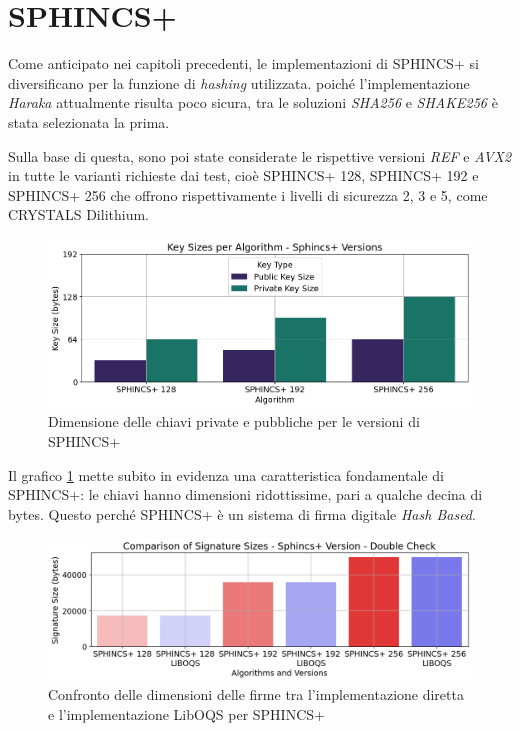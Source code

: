 \section{SPHINCS+}

Come anticipato nei capitoli precedenti, le implementazioni di SPHINCS+ si diversificano per la funzione di \textit{hashing} utilizzata. poiché l'implementazione \textit{Haraka} attualmente risulta poco sicura, tra le soluzioni \textit{SHA256} e \textit{SHAKE256} è stata selezionata la prima.

Sulla base di questa, sono poi state considerate le rispettive versioni \textit{REF} e \textit{AVX2} in tutte le varianti richieste dai test, cioè SPHINCS+ 128, SPHINCS+ 192 e SPHINCS+ 256 che offrono rispettivamente i livelli di sicurezza 2, 3 e 5, come CRYSTALS Dilithium.

\begin{figure}[H]
    \centering
    \includegraphics[width=1\textwidth]{Immagini/20240822_i9/Key_Sizes/KC_sphincs.png}
    \caption{Dimensione delle chiavi private e pubbliche per le versioni di SPHINCS+}
    \label{fig:KC_sphincs}
\end{figure}

Il grafico \ref{fig:KC_sphincs} mette subito in evidenza una caratteristica fondamentale di SPHINCS+: le chiavi hanno dimensioni ridottissime, pari a qualche decina di bytes. Questo perché SPHINCS+ è un sistema di firma digitale \textit{Hash Based}.

\begin{figure}[H]
    \centering
    \includegraphics[width=1\textwidth]{Immagini/20240822_i9/Message_IO/double_check/IO_sphincs.png}
    \caption{Confronto delle dimensioni delle firme tra l'implementazione diretta e l'implementazione LibOQS per SPHINCS+}
    \label{fig:IO_sphincs}
\end{figure}

